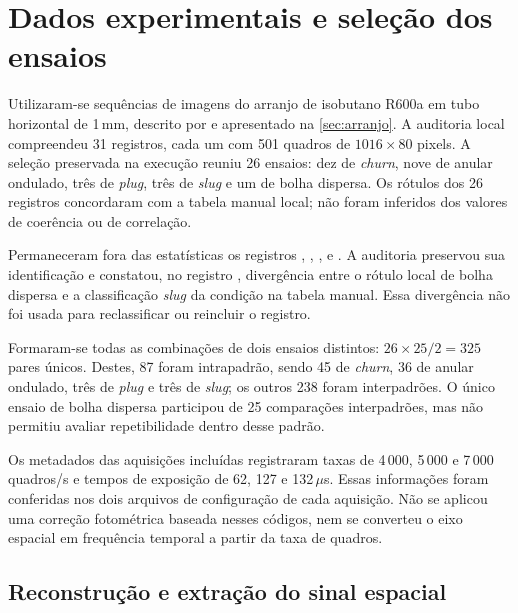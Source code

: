 \section{Dados experimentais e seleção dos ensaios}\label{sec:met-dados}

Utilizaram-se sequências de imagens do arranjo de isobutano R600a em tubo horizontal
de 1\,mm, descrito por  e apresentado na
\autoref{sec:arranjo}. A auditoria local compreendeu 31 registros, cada um com 501
quadros de $1016\times80$ pixels. A seleção preservada na execução reuniu 26 ensaios:
dez de \textit{churn}, nove de anular ondulado, três de \textit{plug}, três de
\textit{slug} e um de bolha dispersa. Os rótulos dos 26 registros concordaram com a
tabela manual local; não foram inferidos dos valores de coerência ou de correlação.

Permaneceram fora das estatísticas os registros ,
, ,  e
. A auditoria preservou sua identificação e constatou, no
registro , divergência entre o rótulo local de bolha dispersa e
a classificação \textit{slug} da condição na tabela manual. Essa divergência não
foi usada para reclassificar ou reincluir o registro.

Formaram-se todas as combinações de dois ensaios distintos: $26\times25/2=325$
pares únicos. Destes, 87 foram intrapadrão, sendo 45 de \textit{churn}, 36 de anular
ondulado, três de \textit{plug} e três de \textit{slug}; os outros 238 foram
interpadrões. O único ensaio de bolha dispersa participou de 25 comparações
interpadrões, mas não permitiu avaliar repetibilidade dentro desse padrão.

Os metadados das aquisições incluídas registraram taxas de 4\,000, 5\,000 e
7\,000 quadros/s e tempos de exposição de 62, 127 e 132\,$\mu$s. Essas informações
foram conferidas nos dois arquivos de configuração de cada aquisição. Não se
aplicou uma correção fotométrica baseada nesses códigos, nem se converteu o eixo
espacial em frequência temporal a partir da taxa de quadros.

\subsection{Reconstrução e extração do sinal espacial}\label{sec:met-extracao}

